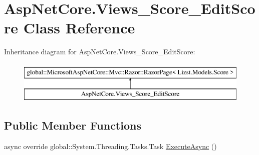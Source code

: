 \hypertarget{class_asp_net_core_1_1_views___score___edit_score}{}\section{Asp\+Net\+Core.\+Views\+\_\+\+Score\+\_\+\+Edit\+Score Class Reference}
\label{class_asp_net_core_1_1_views___score___edit_score}
Inheritance diagram for Asp\+Net\+Core.\+Views\+\_\+\+Score\+\_\+\+Edit\+Score\+:\begin{figure}[H]
\begin{center}
\leavevmode
\includegraphics[height=2.000000cm]{class_asp_net_core_1_1_views___score___edit_score}
\end{center}
\end{figure}
\subsection*{Public Member Functions}
\begin{DoxyCompactItemize}
\item 
async override global\+::\+System.\+Threading.\+Tasks.\+Task \mbox{\hyperlink{class_asp_net_core_1_1_views___score___edit_score_a486c1c0d00b0385828297968f125fef9}{Execute\+Async}} ()
\end{DoxyCompactItemize}
